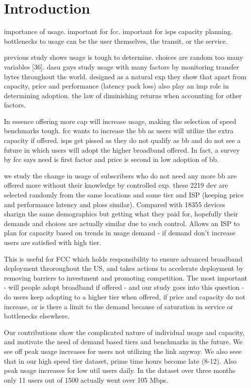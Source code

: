 \section{Introduction}\label{sec:introduction}

importance of usage. important for fcc. important for isps capacity planning. bottlenecks to usage can be the user themselves, the transit, or the service.

previous study shows usage is tough to determine. choices are random too many variables [36]. dasu guys study usage with many factors by monitoring transfer bytes throughout the world. designed as a natural exp they show that apart from capacity, price and performance (latency pack loss) also play an imp role in determining adoption. the law of diminishing returns when accounting for other factors.

In essence offering more cap will increase usage, making the selection of speed benchmarks tough. fcc wants to increase the bb as users will utilize the extra capacity if offered. isps get pissed as they do not qualify as bb and do not see a future in which users will adopt the higher broadband offered. In fact, a survey by fcc says need is first factor and price is second in low adoption of bb.

we study the change in usage of subscribers who do not need any more bb are offered more without their knowledge by controlled exp. these 2219 dev are selected randomly from the same locations and same tier and ISP (keeping price and performance latency and ploss similar). Compared with 18355 devices sharign the same demographics but getting what they paid for, hopefully their demands and choices are actually similar due to such control. Allows an ISP to plan for capacity based on trends in usage demand - if demand don't increase users are satisfied with high tier.

This is useful for FCC which holds responsibility to ensure advanced broadband deployment throroughout the US, and takes actions to accelerate deployment by removing barriers to investment and promoting competition. The most important - will people adopt broadband if offered - and our study goes into this question - do users keep adopting to a higher tier when offered, if price and capacity do not increase, or is there a limit to the demand because of saturation in service or bottlenecks elsewhere.

Our contributions show the complicated nature of individual usage and capacity, and motivate the need of demand based tiers and benchmarks in the future. We see off peak usage increases for users not utilizing the link anyway. We also seee that in our high speed tier dataset, prime time hours become late (8-12). Also peak usage increases for low util users daily. In the dataset over three months only 11 users out of 1500 actually went over 105 Mbps.

